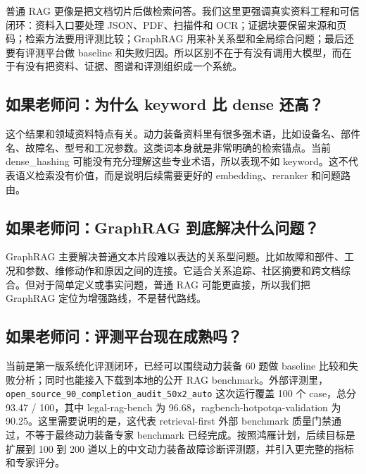 \documentclass[11pt, a4paper]{ctexart}
\begin{document}
普通 RAG 更像是把文档切片后做检索问答。我们这里更强调真实资料工程和可信闭环：资料入口要处理 JSON、PDF、扫描件和 OCR；证据块要保留来源和页码；检索方法要用评测比较；GraphRAG 用来补关系型和全局综合问题；最后还要有评测平台做 baseline 和失败归因。所以区别不在于有没有调用大模型，而在于有没有把资料、证据、图谱和评测组织成一个系统。\\

\subsection*{如果老师问：为什么 keyword 比 dense 还高？}

这个结果和领域资料特点有关。动力装备资料里有很多强术语，比如设备名、部件名、故障名、型号和工况参数。这类词本身就是非常明确的检索锚点。当前 dense\_hashing 可能没有充分理解这些专业术语，所以表现不如 keyword。这不代表语义检索没有价值，而是说明后续需要更好的 embedding、reranker 和问题路由。\\

\subsection*{如果老师问：GraphRAG 到底解决什么问题？}

GraphRAG 主要解决普通文本片段难以表达的关系型问题。比如故障和部件、工况和参数、维修动作和原因之间的连接。它适合关系追踪、社区摘要和跨文档综合。但对于简单定义或事实问题，普通 RAG 可能更直接，所以我们把 GraphRAG 定位为增强路线，不是替代路线。\\

\subsection*{如果老师问：评测平台现在成熟吗？}

当前是第一版系统化评测闭环，已经可以围绕动力装备 60 题做 baseline 比较和失败分析；同时也能接入下载到本地的公开 RAG benchmark。外部评测里，\texttt{open\_source\_90\_completion\_audit\_50x2\_auto} 这次运行覆盖 100 个 case，总分 93.47 / 100，其中 legal-rag-bench 为 96.68，ragbench-hotpotqa-validation 为 90.25。这里需要说明的是，这代表 retrieval-first 外部 benchmark 质量门禁通过，不等于最终动力装备专家 benchmark 已经完成。按照鸿雁计划，后续目标是扩展到 100 到 200 道以上的中文动力装备故障诊断评测题，并引入更完整的指标和专家评分。\\
\end{document}
